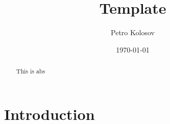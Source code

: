 \documentclass[12pt,letterpaper,oneside,reqno]{amsart}
\title[Template]
{Template}
\author[Petro Kolosov]{Petro Kolosov}
\date{\today}
\numberwithin{equation}{section}
\begin{document}
    \begin{abstract} This is abs
    \end{abstract}
    \maketitle
    \tableofcontents


    \section{Introduction}
    
\end{document}
